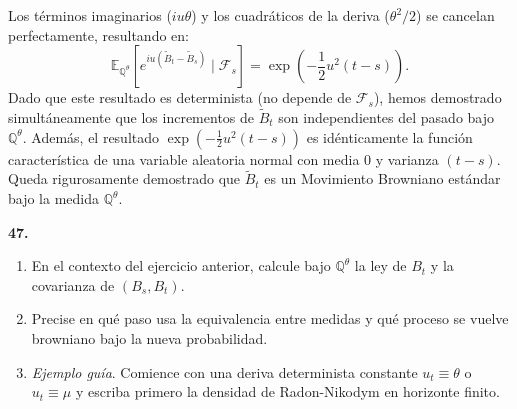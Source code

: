 \documentclass[11pt, letterpaper]{article}
\begin{document}
\begin{solucion}
    Los términos imaginarios ($iu\theta$) y los cuadráticos de la deriva ($\theta^2/2$) se cancelan perfectamente, resultando en:
    \[ \mathbb{E}_{\mathbb{Q}^\theta}[e^{iu(\tilde{B}_t - \tilde{B}_s)} \mid \mathcal{F}_s] = \exp\left( -\frac{1}{2}u^2(t - s) \right). \]
    Dado que este resultado es determinista (no depende de $\mathcal{F}_s$), hemos demostrado simultáneamente que los incrementos de $\tilde{B}_t$ son independientes del pasado bajo $\mathbb{Q}^\theta$. Además, el resultado $\exp(-\frac{1}{2}u^2(t-s))$ es idénticamente la función característica de una variable aleatoria normal con media $0$ y varianza $(t - s)$. 
    Queda rigurosamente demostrado que $\tilde{B}_t$ es un Movimiento Browniano estándar bajo la medida $\mathbb{Q}^\theta$.
\end{solucion}

\newpage

\begin{ejercicio}
    \textbf{47.} 
    \begin{enumerate}
        \item[(a)] En el contexto del ejercicio anterior, calcule bajo $\mathbb{Q}^\theta$ la ley de $B_t$ y la covarianza de $(B_s, B_t)$.
        \item[(b)] Precise en qué paso usa la equivalencia entre medidas y qué proceso se vuelve browniano bajo la nueva probabilidad.
        \item[(c)] \textit{Ejemplo guía}. Comience con una deriva determinista constante $u_t \equiv \theta$ o $u_t \equiv \mu$ y escriba primero la densidad de Radon-Nikodym en horizonte finito.
    \end{enumerate}
\end{ejercicio}

\vspace{5mm}
\end{document}
